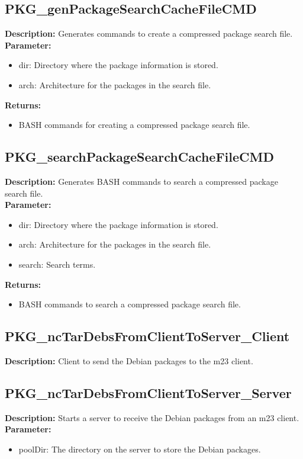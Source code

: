 \subsection{PKG\_genPackageSearchCacheFileCMD}
\textbf{Description:} Generates commands to create a compressed package search file.\\
\textbf{Parameter:}
\begin{itemize}
\item dir: Directory where the package information is stored.
\item arch: Architecture for the packages in the search file.
\end{itemize}
\textbf{Returns:}
\begin{itemize}
\item BASH commands for creating a compressed package search file.
\end{itemize}

\subsection{PKG\_searchPackageSearchCacheFileCMD}
\textbf{Description:} Generates BASH commands to search a compressed package search file.\\
\textbf{Parameter:}
\begin{itemize}
\item dir: Directory where the package information is stored.
\item arch: Architecture for the packages in the search file.
\item search: Search terms.
\end{itemize}
\textbf{Returns:}
\begin{itemize}
\item BASH commands to search a compressed package search file.
\end{itemize}

\subsection{PKG\_ncTarDebsFromClientToServer\_Client}
\textbf{Description:} Client to send the Debian packages to the m23 client.\\

\subsection{PKG\_ncTarDebsFromClientToServer\_Server}
\textbf{Description:} Starts a server to receive the Debian packages from an m23 client.\\
\textbf{Parameter:}
\begin{itemize}
\item poolDir: The directory on the server to store the Debian packages.
\end{itemize}

